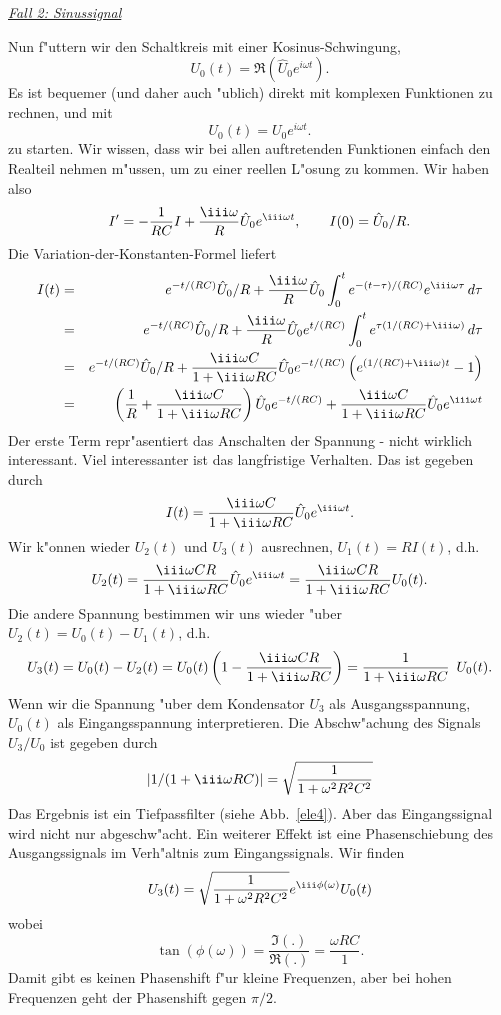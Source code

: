 \underline{{\it Fall 2: Sinussignal}}\par
Nun f"uttern wir den Schaltkreis mit einer Kosinus-Schwingung,
$$ U_0(t) = \Re(\hat U_0 e^{i\omega t}).$$
Es ist bequemer (und daher auch "ublich) direkt mit komplexen Funktionen zu rechnen,
und mit 
$$ U_0(t) = U_0 e^{i\omega t}.$$
zu starten. Wir wissen, dass wir bei allen auftretenden Funktionen einfach den Realteil 
nehmen m"ussen, um zu einer reellen L"osung zu kommen. Wir haben also
$$  I'  = -  \frac 1{R C} I + \frac { \iii \omega} R \hat U_0 e^{\iii\omega t}, \qquad I(0) = \hat U_0/R. $$
Die Variation-der-Konstanten-Formel liefert
\begin{eqnarray*} 
I(t) & = & 
e^{-t/(RC)}\hat U_0/R + \frac { \iii \omega}R \hat U_0 \int_0^t e^{-(t-\tau)/(RC)}  e^{\iii\omega \tau}\, d\tau\\
& = & 
e^{-t/(RC)}\hat U_0/R + \frac { \iii \omega}R \hat U_0  e^{ t/(RC)}  \int_0^t e^{\tau(1/(RC)+\iii\omega)} \, d\tau\\
& = & 
e^{-t/(RC)}\hat U_0/R + \frac { \iii \omega C}{1+\iii\omega RC} \hat U_0  e^{- t/(RC)}  \left(e^{(1/(RC)+\iii\omega)t} -1\right)\\
& = & 
\left( \frac 1 R +  \frac { \iii \omega C}{1+\iii\omega RC}\right) \hat U_0  e^{- t/(RC)} 
+ \frac { \iii \omega C}{1+\iii\omega RC} \hat U_0 e^{\iii\omega t}
\end{eqnarray*}
Der erste Term repr"asentiert das Anschalten der Spannung - nicht wirklich interessant. Viel
interessanter ist das langfristige Verhalten. Das ist gegeben durch
$$ I(t) =  \frac { \iii \omega C}{1+\iii\omega RC} \hat U_0 e^{\iii\omega t}. $$
Wir k"onnen wieder $U_2(t)$ und $U_3(t)$ ausrechnen, $U_1(t) = R I(t)$, d.h.
$$ U_2(t) 
= \frac { \iii \omega CR}{1+\iii\omega RC} \hat U_0 e^{\iii\omega t}
= \frac { \iii \omega CR}{1+\iii\omega RC} U_0(t)
. $$
Die andere Spannung bestimmen wir uns wieder "uber $U_2(t) = U_0(t)-U_1(t)$, d.h.
$$ U_3(t) 
= U_0(t)-U_2(t) = U_0(t)\left(1 - \frac { \iii \omega CR}{1+\iii\omega RC}\right)
 =  \frac { 1}{1+\iii\omega RC}\,\,\,U_0(t).
$$
Wenn wir die Spannung "uber dem Kondensator $U_3$ als Ausgangsspannung, $U_0(t)$ als Eingangsspannung
interpretieren. Die Abschw"achung des Signals $U_3/U_0$ ist gegeben durch
$$ |1/(1+\iii\omega RC)| = \sqrt{\frac{1}{1+\omega^2 R^2C^2}}$$
Das Ergebnis ist ein Tiefpassfilter (siehe Abb.~\ref{ele4}). Aber das Eingangssignal wird nicht nur abgeschw"acht. 
Ein weiterer Effekt ist eine Phasenschiebung des Ausgangssignals im Verh"altnis zum Eingangssignals.
Wir finden 
$$ U_3(t) =  
 \sqrt{\frac{1}{1+\omega^2 R^2C^2}} e^{\iii \phi(\omega)} U_0(t)
$$
wobei
$$ \tan(\phi(\omega)) = \frac{\Im(.)}{\Re(.)} = \frac{\omega RC} 1.
$$
Damit gibt es keinen Phasenshift f"ur kleine Frequenzen, aber bei hohen Frequenzen geht der
Phasenshift gegen $\pi/2$. 


